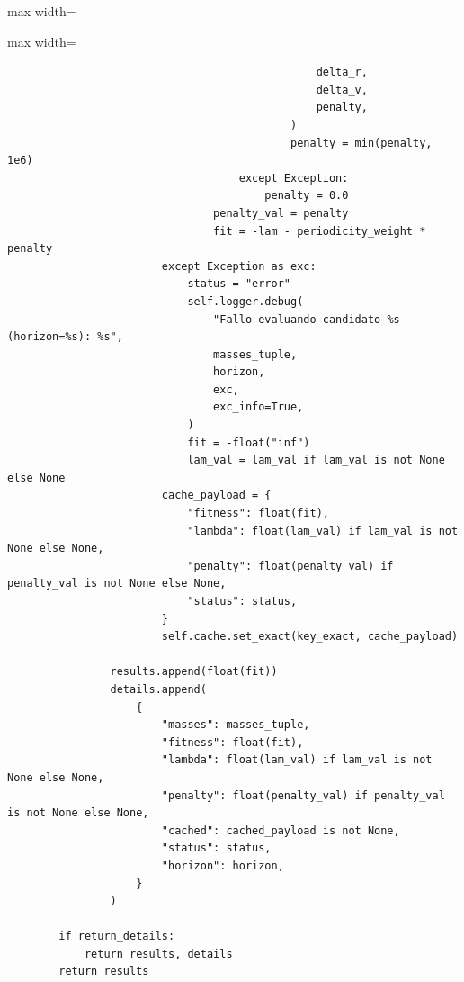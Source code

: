 \begin{listing}[H]
\begin{adjustbox}{max width=\textwidth}
\begin{minipage}{\linewidth}
{\begin{adjustbox}{max width=\textwidth}
\begin{minipage}{\textwidth}
\begin{verbatim}
                                                delta_r,
                                                delta_v,
                                                penalty,
                                            )
                                            penalty = min(penalty, 1e6)
                                    except Exception:
                                        penalty = 0.0
                                penalty_val = penalty
                                fit = -lam - periodicity_weight * penalty
                        except Exception as exc:
                            status = "error"
                            self.logger.debug(
                                "Fallo evaluando candidato %s (horizon=%s): %s",
                                masses_tuple,
                                horizon,
                                exc,
                                exc_info=True,
                            )
                            fit = -float("inf")
                            lam_val = lam_val if lam_val is not None else None
                        cache_payload = {
                            "fitness": float(fit),
                            "lambda": float(lam_val) if lam_val is not None else None,
                            "penalty": float(penalty_val) if penalty_val is not None else None,
                            "status": status,
                        }
                        self.cache.set_exact(key_exact, cache_payload)

                results.append(float(fit))
                details.append(
                    {
                        "masses": masses_tuple,
                        "fitness": float(fit),
                        "lambda": float(lam_val) if lam_val is not None else None,
                        "penalty": float(penalty_val) if penalty_val is not None else None,
                        "cached": cached_payload is not None,
                        "status": status,
                        "horizon": horizon,
                    }
                )

        if return_details:
            return results, details
        return results
\end{verbatim}
\end{minipage}
\end{adjustbox}


}
\end{minipage}
\end{adjustbox}
\end{listing}



